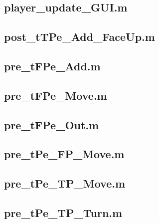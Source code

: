\documentclass[runningheads,a4paper]{llncs}
\newcommand{\GPenSIM}{../GPenSIM}
\begin{document}
\subsection{player\_update\_GUI.m}
\label{app:player_update_GUI}


\subsection{post\_tTPe\_Add\_FaceUp.m}
\label{app:post_tTPe_Add_FaceUp}


\subsection{pre\_tFPe\_Add.m}
\label{app:pre_tFPe_Add}


\subsection{pre\_tFPe\_Move.m}
\label{app:pre_tFPe_Move}


\subsection{pre\_tFPe\_Out.m}
\label{app:pre_tFPe_Out}


\subsection{pre\_tPe\_FP\_Move.m}
\label{app:pre_tPe_FP_Move}


\subsection{pre\_tPe\_TP\_Move.m}
\label{app:pre_tPe_TP_Move}


\subsection{pre\_tPe\_TP\_Turn.m}
\label{app:pre_tPe_TP_Turn}

\end{document}
